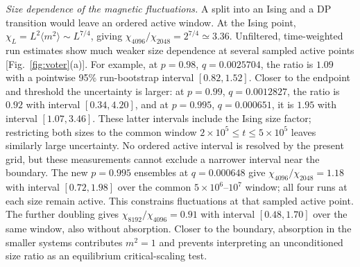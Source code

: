\documentclass[pre,twocolumn,superscriptaddress,showpacs,floatfix]{revtex4-2}
\begin{document}
\textit{Size dependence of the magnetic fluctuations.} A split into an Ising
and a DP transition would leave an ordered active window. At the Ising point,
$\chi_L=L^2\langle m^2\rangle\sim L^{7/4}$, giving
$\chi_{4096}/\chi_{2048}=2^{7/4}\simeq3.36$.
Unfiltered, time-weighted run estimates show much weaker size dependence
at several sampled active points [Fig.~\ref{fig:voter}(a)]. For example,
at $p=0.98$, $q=0.0025704$, the ratio is $1.09$ with a pointwise
95\% run-bootstrap interval $[0.82,1.52]$.
Closer to the endpoint and threshold the uncertainty is larger:
at $p=0.99$, $q=0.0012827$, the ratio is $0.92$ with interval
$[0.34,4.20]$, and at $p=0.995$, $q=0.000651$, it is $1.95$
with interval $[1.07,3.46]$. These latter intervals include the Ising
size factor; restricting both sizes to the common window
$2\times10^5\le t\le5\times10^5$ leaves similarly large uncertainty.
No ordered active interval is resolved by the present grid,
but these measurements cannot exclude a narrower interval near the boundary.
The new $p=0.995$ ensembles at $q=0.000648$ give
$\chi_{4096}/\chi_{2048}=1.18$ with interval $[0.72,1.98]$ over the
common $5\times10^6$--$10^7$ window; all four runs at each size remain
active. This constrains fluctuations at that sampled active point.
The further doubling gives $\chi_{8192}/\chi_{4096}=0.91$ with interval
$[0.48,1.70]$ over the same window, also without absorption.
Closer to the boundary, absorption in the smaller systems contributes
$m^2=1$ and prevents interpreting an unconditioned size ratio as an
equilibrium critical-scaling test.
\end{document}

